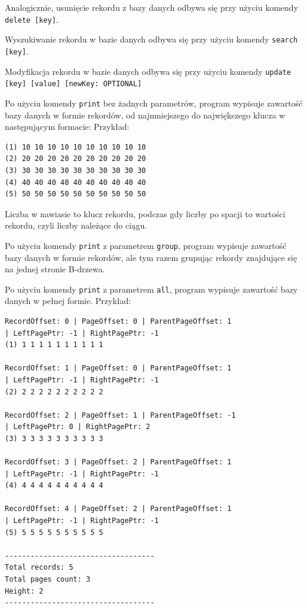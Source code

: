\documentclass[12pt]{article}
\begin{document}
Analogicznie, usunięcie rekordu z bazy danych odbywa się przy użyciu komendy \verb!delete [key]!.

Wyszukiwanie rekordu w bazie danych odbywa się przy użyciu komendy \verb!search [key]!.

Modyfikacja rekordu w bazie danych odbywa się przy użyciu komendy \verb!update [key] [value] [newKey: OPTIONAL]!

Po użyciu komendy \verb!print! bez żadnych parametrów, program wypisuje zawartość bazy danych w formie rekordów, od najmniejszego
do największego klucza w następującym formacie:
Przykład:
\begin{tcolorbox}[colframe=black!75, colback=white!95, title=Output komendy \texttt{print}]
\begin{verbatim}
(1) 10 10 10 10 10 10 10 10 10 10
(2) 20 20 20 20 20 20 20 20 20 20
(3) 30 30 30 30 30 30 30 30 30 30
(4) 40 40 40 40 40 40 40 40 40 40
(5) 50 50 50 50 50 50 50 50 50 50
\end{verbatim}
\end{tcolorbox}

Liczba w nawiasie to klucz rekordu, podczas gdy liczby po spacji to wartości rekordu, czyli liczby należące do ciągu.

Po użyciu komendy \verb!print! z parametrem \verb!group!, program wypisuje zawartość bazy danych w formie rekordów,
ale tym razem grupując rekordy znajdujące się na jednej stronie B-drzewa.

Po użyciu komendy \verb!print! z parametrem \verb!all!, program wypisuje zawartość bazy danych w pełnej formie. Przykład:
\begin{tcolorbox}[colframe=black!75, colback=white!95, title=Output komendy \texttt{print all}]
\begin{verbatim}
RecordOffset: 0 | PageOffset: 0 | ParentPageOffset: 1 
| LeftPagePtr: -1 | RightPagePtr: -1
(1) 1 1 1 1 1 1 1 1 1 1 

RecordOffset: 1 | PageOffset: 0 | ParentPageOffset: 1 
| LeftPagePtr: -1 | RightPagePtr: -1
(2) 2 2 2 2 2 2 2 2 2 2 

RecordOffset: 2 | PageOffset: 1 | ParentPageOffset: -1 
| LeftPagePtr: 0 | RightPagePtr: 2
(3) 3 3 3 3 3 3 3 3 3 3 

RecordOffset: 3 | PageOffset: 2 | ParentPageOffset: 1 
| LeftPagePtr: -1 | RightPagePtr: -1
(4) 4 4 4 4 4 4 4 4 4 4 

RecordOffset: 4 | PageOffset: 2 | ParentPageOffset: 1 
| LeftPagePtr: -1 | RightPagePtr: -1
(5) 5 5 5 5 5 5 5 5 5 5 

-----------------------------------
Total records: 5
Total pages count: 3
Height: 2
-----------------------------------
\end{verbatim}
\end{tcolorbox}
\end{document}
